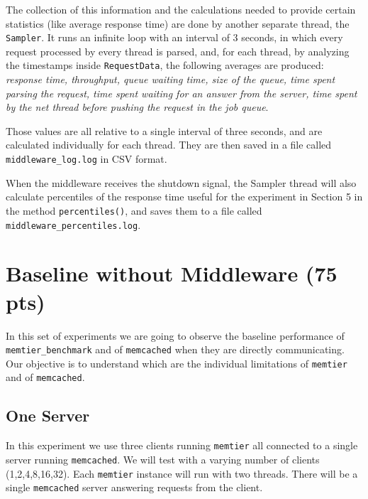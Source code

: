 \documentclass[11pt,a4paper]{article}
\renewcommand{\t}[1]{%
	{\texttt{#1}}}
\begin{document}
The collection of this information and the calculations needed to provide certain statistics (like average response time)
are done by another separate thread, the \t{Sampler}. 
It runs an infinite loop with an interval of 3 seconds, in which every request processed by every thread is parsed, 
and, for each thread, by analyzing the timestamps inside \t{RequestData}, the following averages are produced:
\emph{response time, throughput, queue waiting time, size of the queue, time spent parsing the request,
time spent waiting for an answer from the server, time spent by the net thread before pushing the request in the job queue}.

Those values are all relative to a single interval of three seconds, and are calculated individually for each thread.
They are then saved in a file called \t{middleware\_log.log} in CSV format.

When the middleware receives the shutdown signal, the Sampler thread will also calculate percentiles of the response time useful for the
experiment in Section 5 in the method \t{percentiles()}, and saves them to a file called \t{middleware\_percentiles.log}.




























\section{Baseline without Middleware (75 pts)}

In this set of experiments we are going to observe the baseline performance of
\verb|memtier_benchmark| and of \verb|memcached| when they are directly
communicating. Our objective is to understand which are the individual
limitations of \verb|memtier| and of \verb|memcached|.

\subsection{One Server}

In this experiment we use three clients running \t{memtier} all connected to a
single server running \t{memcached}.  We will test with a varying number of
clients (1,2,4,8,16,32). Each \t{memtier} instance will run with two threads.
There will be a single \t{memcached} server answering requests from the client.
\end{document}
